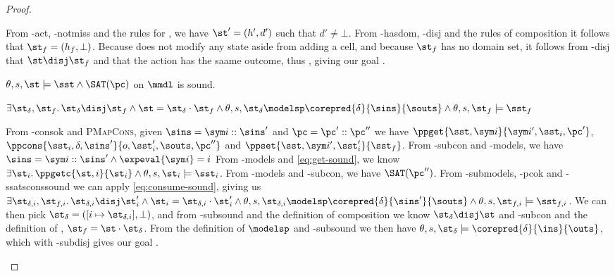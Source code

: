 \begin{proof}
\pfcase{$\alpha=\alloc$}

\begin{hypvlist}
 From \hyp{act}, \hyp{notmiss} and the rules for \alloc{}, we have $\st'=(h',d')$ such that $d'\neq\bot$.
 From \hyp{hasdom}, \hyp{disj} and the rules of composition it follows that $\st_f=(h_f,\bot)$.
 Because \alloc{} does not modify any state aside from adding a cell, and because $\st_f$ has no domain set, it follows from \hyp{disj} that $\st\disj\st_f$ and that the action has the saame outcome, thus , giving our goal .
\end{hypvlist}


\pfassume \begin{hypvlist}
 
 $\theta,s,\st\models \sst \land \SAT(\pc)$
 \consume{} on $\mmdl$ is sound.
\end{hypvlist}
\pfprove \begin{goalvlist}
 $\exists \st_\delta, \st_f \ldotp \st_\delta\disj\st_f \land \st=\st_\delta\cdot\st_f \land \theta, s, \st_\delta \modelsp \corepred{\delta}{\sins}{\souts} \land \theta,s,\st_f\models \sst_f$
\end{goalvlist}

\pfcase{$\delta \in \preds_\mmdl$}

\begin{hypvlist}
 From \hyp{consok} and \textsc{PMapCons}, given $\sins=\sym i::\sins'$ and $\pc=\pc'::\pc''$ we have $\ppget{\sst,\sym i}{\sym i', \sst_i, \pc'}$, ${\ppcons{\sst_i,\delta,\sins'}{o,\sst_i',\souts,\pc''}}$ and $\ppset{\sst,\sym i',\sst_i'}{\sst_f}$.
 From \hyp{subcon} and \hyp{models}, we have $\sins=\sym i ::\sins' \land \expeval{\sym i}=i$
 From \hyp{models} and \ref{eq:get-sound}, we know $\exists \st_i\ldotp \ppgetc{\st,i}{\st_i} \land \theta,s,\st_i\models\sst_i$.
 From \hyp{models} and \hyp{subcon}, we have $\SAT(\pc'')$.
 From \hyp{submodels}, \hyp{pcok} and \hyp{ssatsconssound} we can apply \ref{eq:consume-sound}, giving us $\exists \st_{\delta,i}, \st_{f,i}\ldotp \st_{\delta,i}\disj \st_i' \land \st_i=\st_{\delta,i}\cdot\st_i' \land \theta,s,\st_{\delta,i}\modelsp \corepred{\delta}{\sins'}{\souts} \land \theta,s,\st_{f,i}\models\sst_{f,i}$.
 We can then pick $\st_\delta=([i\mapsto \st_{\delta,i}], \bot)$, and from \hyp{subsound} and the definition of composition we know $\st_\delta\disj\st$ and \hyp{subcon} and the definition of , $\st_f=\st\cdot\st_\delta$.
 From the definition of $\modelsp$ and \hyp{subsound} we then have $\theta,s,\st_\delta\models\corepred{\delta}{\ins}{\outs}$, which with \hyp{subdisj} gives our goal .
\end{hypvlist}


\end{proof}
